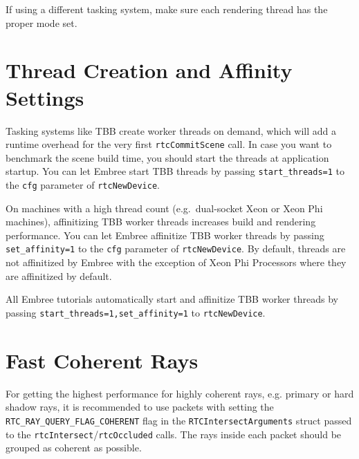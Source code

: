 \begin{Shaded}
\begin{Highlighting}[]
\OperatorTok{(}\OperatorTok{);}
\OperatorTok{(}\OperatorTok{);}
\end{Highlighting}
\end{Shaded}

If using a different tasking system, make sure each rendering thread has
the proper mode set.

\section{Thread Creation and Affinity
Settings}\label{thread-creation-and-affinity-settings}

Tasking systems like TBB create worker threads on demand, which will add
a runtime overhead for the very first \texttt{rtcCommitScene} call. In
case you want to benchmark the scene build time, you should start the
threads at application startup. You can let Embree start TBB threads by
passing \texttt{start\_threads=1} to the \texttt{cfg} parameter of
\texttt{rtcNewDevice}.

On machines with a high thread count (e.g.~dual-socket Xeon or Xeon Phi
machines), affinitizing TBB worker threads increases build and rendering
performance. You can let Embree affinitize TBB worker threads by passing
\texttt{set\_affinity=1} to the \texttt{cfg} parameter of
\texttt{rtcNewDevice}. By default, threads are not affinitized by Embree
with the exception of Xeon Phi Processors where they are affinitized by
default.

All Embree tutorials automatically start and affinitize TBB worker
threads by passing \texttt{start\_threads=1,set\_affinity=1} to
\texttt{rtcNewDevice}.

\section{Fast Coherent Rays}\label{fast-coherent-rays}

For getting the highest performance for highly coherent rays, e.g.
primary or hard shadow rays, it is recommended to use packets with
setting the \texttt{RTC\_RAY\_QUERY\_FLAG\_COHERENT} flag in the
\texttt{RTCIntersectArguments} struct passed to the
\texttt{rtcIntersect}/\texttt{rtcOccluded} calls. The rays inside each
packet should be grouped as coherent as possible.

